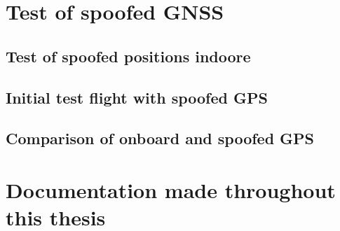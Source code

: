 \section{Test of spoofed GNSS}


\subsection{Test of spoofed positions indoore}
\label{sec:test_of_spoofed_positions_indoore}



\subsection{Initial test flight with spoofed GPS}
\label{sec:test_of_spoofed_positions_outdoore}


\subsection{Comparison of onboard and spoofed GPS}
\label{sec:test_of_spoofed_positions_outdoore}


\section{Documentation made throughout this thesis}